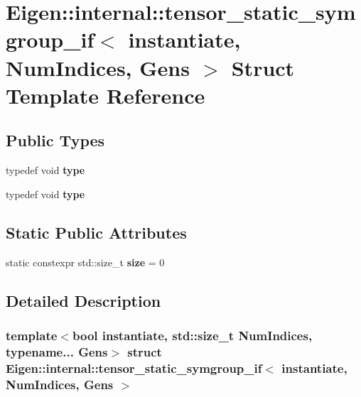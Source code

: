 \hypertarget{struct_eigen_1_1internal_1_1tensor__static__symgroup__if}{}\section{Eigen\+:\+:internal\+:\+:tensor\+\_\+static\+\_\+symgroup\+\_\+if$<$ instantiate, Num\+Indices, Gens $>$ Struct Template Reference}
\label{struct_eigen_1_1internal_1_1tensor__static__symgroup__if}
\subsection*{Public Types}
\begin{DoxyCompactItemize}
\item 
\mbox{\label{struct_eigen_1_1internal_1_1tensor__static__symgroup__if_a1d4b6665a178dcf3d6fdec630dafac5a}} 
typedef void {\bfseries type}
\item 
\mbox{\label{struct_eigen_1_1internal_1_1tensor__static__symgroup__if_a1d4b6665a178dcf3d6fdec630dafac5a}} 
typedef void {\bfseries type}
\end{DoxyCompactItemize}
\subsection*{Static Public Attributes}
\begin{DoxyCompactItemize}
\item 
\mbox{\label{struct_eigen_1_1internal_1_1tensor__static__symgroup__if_adf23eb169853e23922e49cbe879a5d6e}} 
static constexpr std\+::size\+\_\+t {\bfseries size} = 0
\end{DoxyCompactItemize}


\subsection{Detailed Description}
\subsubsection*{template$<$bool instantiate, std\+::size\+\_\+t Num\+Indices, typename... Gens$>$\newline
struct Eigen\+::internal\+::tensor\+\_\+static\+\_\+symgroup\+\_\+if$<$ instantiate, Num\+Indices, Gens $>$}



